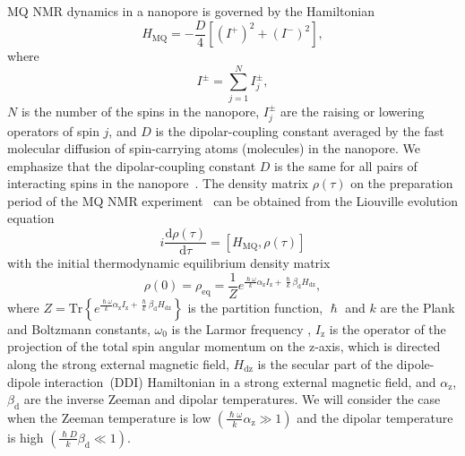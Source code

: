 \documentclass[review]{elsarticle}
\begin{document}
MQ NMR dynamics in a nanopore is governed by the Hamiltonian~\cite{Doronin_2019,Doronin_2009} 
%
\begin{equation}
    \label{eq:1}
    H_{\mathrm{MQ}} = - \dfrac{D}{4} \left[
        \left(I^{+}\right)^{2} 
        + \left(I^{-}\right)^{2} 
    \right] ,
\end{equation}
%
where 
%
\begin{equation}
    \label{eq:2}
    I^{\pm} = \sum\limits_{j=1}^{N} I_{j}^{\pm},
\end{equation}
%
$N$ is the number of the spins in the nanopore, $I^{\pm}_{j}$ are the raising or lowering operators of spin $j$, and $D$ is the dipolar-coupling constant averaged by the fast molecular diffusion of spin-carrying atoms (molecules) in the nanopore.
We emphasize that the dipolar-coupling constant $D$ is the same for all pairs of interacting spins in the nanopore~\cite{Doronin_2019,Doronin_2009}.
The density matrix $\rho(\tau)$ on the preparation period of the MQ NMR experiment~\cite{Baum_1985} can be obtained from the Liouville evolution equation~\cite{Goldman_1970,Abragam_1982} 
%
\begin{equation}
    \label{eq:3}
    i\dfrac{\mathrm{d}\rho(\tau)}{\mathrm{d}\tau} = \left[
    H_\mathrm{MQ},\rho(\tau)
    \right]
\end{equation}
%
with the initial thermodynamic equilibrium density matrix 
%
\begin{equation}
    \label{eq:4}
       \rho(0) = \rho_\mathrm{eq} = \dfrac{1}{Z}
       e^{
            \frac{\hslash \omega}{k} \alpha_\mathrm{z} I_\mathrm{z} 
            + \frac{\hslash }{k} \beta_\mathrm{d} H_\mathrm{dz}
        },
\end{equation}
%
where 
$Z = \mathrm{Tr} \left\{ e^{\frac{\hslash \omega}{k} \alpha_\mathrm{z} I_\mathrm{z} + \frac{\hslash  }{k} \beta_\mathrm{d} H_\mathrm{dz}} \right\}$ is the partition function, 
$\hslash$ and $k$ are the Plank and Boltzmann constants, 
$\omega_{0}$  is the Larmor frequency , $I_\mathrm{z}$ is the operator of the projection of the total spin angular momentum on the z-axis, 
which is directed along the strong external magnetic field,  
$H_\mathrm{dz}$ is the secular part of the dipole-dipole interaction~(DDI) Hamiltonian in a strong external magnetic field, and $\alpha_\mathrm{z}$, $\beta_\mathrm{d}$ are the inverse Zeeman and dipolar temperatures. 
We will consider the case when the Zeeman temperature is low $({\frac{\hslash \omega}{k} \alpha_\mathrm{z}}\gg 1)$ 
and the dipolar temperature is high $\left( \frac{\hslash{D}}{k}\beta_\mathrm{d} \ll 1\right)$.
\end{document}
